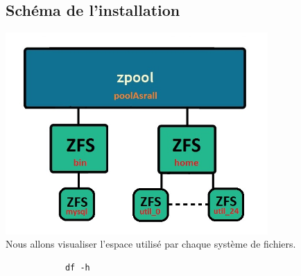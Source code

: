 \documentclass[a4paper]{report}
\begin{document}
	\subsection{Schéma de l'installation}
		\includegraphics[width=10cm]{img/shema.jpg}\\
	Nous allons visualiser l'espace utilisé par chaque système de fichiers.
		\begin{lstlisting}
			df -h
		\end{lstlisting}
\end{document}

